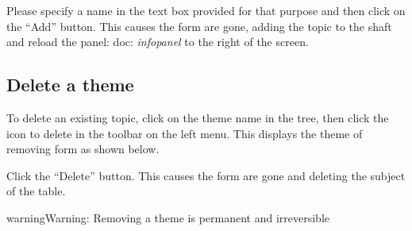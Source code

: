 \documentclass[letterpaper,10pt,english]{sphinxmanual}
\begin{document}

Please specify a name in the text box provided for that purpose and then click on the ``Add'' button. This causes the form are gone, adding the topic to the shaft and reload the panel: doc: \emph{infopanel} to the right of the screen.


\subsection{Delete a theme}
\label{themes/themeslist:supprimer-un-theme}
To delete an existing topic, click on the theme name in the tree, then click the icon to delete in the toolbar on the left menu. This displays the theme of removing form as shown below.


Click the ``Delete'' button. This causes the form are gone and deleting the subject of the table.

\begin{notice}{warning}{Warning:}
Removing a theme is permanent and irreversible
\end{notice}
\end{document}
